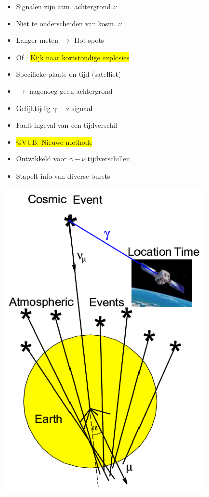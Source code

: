 \twocolumn
\begin{itemize}
\item Signalen zijn atm. achtergrond $\nu$
\item[] Niet te onderscheiden van kosm. $\nu$
\item {\blue Langer meten $\rightarrow$ Hot spots}
\item Of : \colorbox{yellow}{Kijk naar kortstondige explosies}
\item[] Specifieke plaats en tijd (satelliet)
\item[] $\rightarrow$ nagenoeg geen achtergrond
\item Gelijktijdig $\gamma - \nu$ signaal
\item[] Faalt ingeval van een tijdverschil
\item \colorbox{yellow}{@VUB: Nieuwe methode}
\item[] Ontwikkeld voor $\gamma - \nu$ tijdverschillen
\item[] Stapelt info van diverse bursts
\end{itemize}

\newpage

\begin{center}
\includegraphics[keepaspectratio,height=16cm]{atm-bkg}
\end{center}
